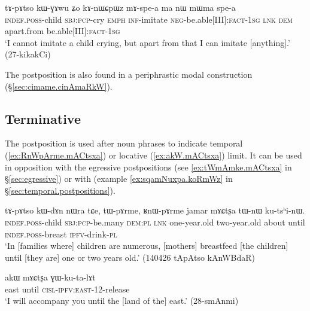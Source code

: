  \begin{exe}
 \ex \label{ex:mAspea.ma.nW.ma}
 \gll tɤ-pɤtso kɯ-ɣɤwu ʑo kɤ-nɯɕpɯz mɤ-spe-a ma nɯ mɯma spe-a \\
 \textsc{indef}.\textsc{poss}-child \textsc{sbj}:\textsc{pcp}-cry \textsc{emph} \textsc{inf}-imitate \textsc{neg}-be.able[III]:\textsc{fact}-\textsc{1sg} \textsc{lnk} \textsc{dem} apart.from be.able[III]:\textsc{fact}-\textsc{1sg}  \\
\glt  `I cannot imitate a child crying, but apart from that I can imitate [anything].' (27-kikakCi)
\end{exe}

The postposition  is also found in a periphrastic modal construction   (§\ref{sec:cimame.cinAmaRkW}).

\subsection{Terminative} \label{sec:terminative}
The postposition  is used after noun phrases to indicate temporal (\ref{ex:RnWpArme.mACtsxa}) or locative (\ref{ex:akW.mACtsxa}) limit. It can be used in opposition with the egressive postpositions (see \ref{ex:tWmAmke.mACtsxa} in §\ref{sec:egressive}) or with  (example \ref{ex:sqamNuxpa.koRmWz} in §\ref{sec:temporal.postpositions}).

\begin{exe}
\ex \label{ex:RnWpArme.mACtsxa}
 \gll tɤ-pɤtso kɯ-dɤn nɯra tɕe, tɯ-pɤrme, ʁnɯ-pɤrme jamar mɤɕtʂa tɯ-nɯ ku-tsʰi-nɯ. \\
 \textsc{indef}.\textsc{poss}-child \textsc{sbj}:\textsc{pcp}-be.many \textsc{dem}:\textsc{pl} \textsc{lnk} one-year.old two-year.old about until \textsc{indef}.\textsc{poss}-breast \textsc{ipfv}-drink-\textsc{pl} \\
 \glt `In [families where] children are numerous, [mothers] breastfeed [the children] until [they are] one or two years old.' (140426 tApAtso kAnWBdaR)
\end{exe}

\begin{exe}
\ex \label{ex:akW.mACtsxa}
 \gll akɯ mɤɕtʂa ɣɯ-ku-ta-lɤt \\ 
east until \textsc{cisl}-\textsc{ipfv}:\textsc{east}-1\fl{}2-release \\
\glt  `I will accompany you until the [land of the] east.' (28-smAnmi) 
\end{exe}

